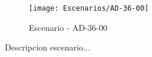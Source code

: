 \begin{figure}[H]
\centering
\texttt{[image: Escenarios/AD-36-00]}
\caption{Escenario - AD-36-00}
\label{fig:AD-36-00}
\end{figure}

Descripcion escenario...
\clearpage
